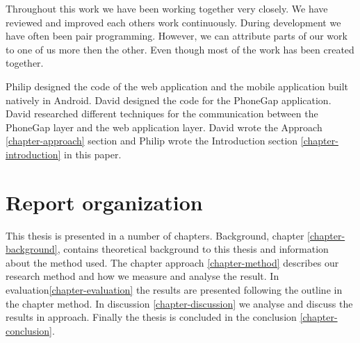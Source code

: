 Throughout this work we have been working together very closely. We have reviewed and improved each others work continuously. During development we have often been pair programming. However, we can attribute parts of our work to one of us more then the other. Even though most of the work has been created together. 

Philip designed the code of the web application and the mobile application built natively in Android. David designed the code for the PhoneGap application. David researched different techniques for the communication between the PhoneGap layer and the web application layer. David wrote the Approach \ref{chapter-approach} section and Philip wrote the Introduction section \ref{chapter-introduction} in this paper. 

\section{Report organization}\label{section-report-organization}
This thesis is presented in a number of chapters. Background, chapter \ref{chapter-background}, contains theoretical background to this thesis and information about the method used. The chapter approach \ref{chapter-method} describes our research method and how we measure and analyse the result. In evaluation\ref{chapter-evaluation} the results are presented following the outline in the chapter method. In discussion \ref{chapter-discussion} we analyse and discuss the results in approach. Finally the thesis is concluded in the conclusion \ref{chapter-conclusion}.